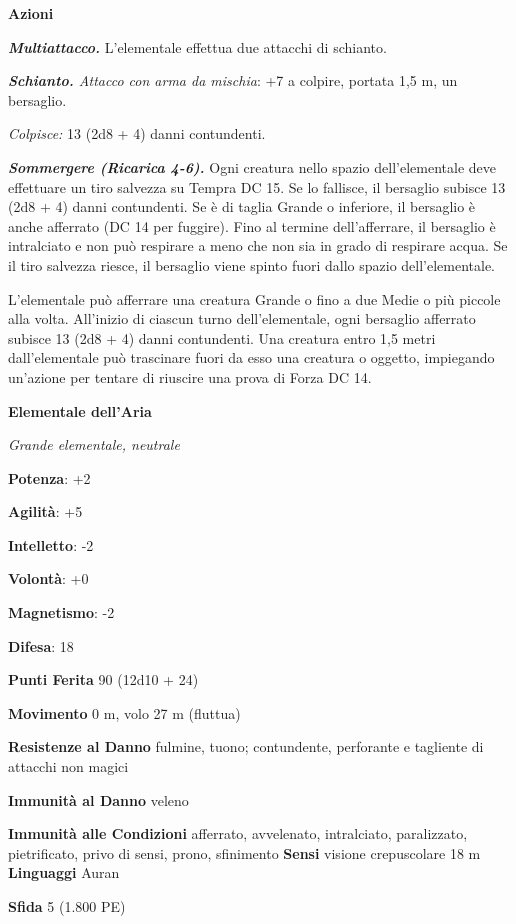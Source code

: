 \begin{multicols}{2}
\textbf{Azioni}

\emph{\textbf{Multiattacco.}} L'elementale effettua due attacchi di
schianto.

\emph{\textbf{Schianto.} Attacco con arma da mischia}: +7 a colpire,
portata 1,5 m, un bersaglio.

\emph{Colpisce:} 13 (2d8 + 4) danni contundenti.

\emph{\textbf{Sommergere (Ricarica 4-6).}} Ogni creatura nello spazio
dell'elementale deve effettuare un tiro salvezza su Tempra DC 15. Se lo
fallisce, il bersaglio subisce 13 (2d8 + 4) danni contundenti. Se è di
taglia Grande o inferiore, il bersaglio è anche afferrato (DC 14 per
fuggire). Fino al termine dell'afferrare, il bersaglio è intralciato e
non può respirare a meno che non sia in grado di respirare acqua. Se il
tiro salvezza riesce, il bersaglio viene spinto fuori dallo spazio
dell'elementale.

L'elementale può afferrare una creatura Grande o fino a due Medie o più
piccole alla volta. All'inizio di ciascun turno dell'elementale, ogni
bersaglio afferrato subisce 13 (2d8 + 4) danni contundenti. Una creatura
entro 1,5 metri dall'elementale può trascinare fuori da esso una
creatura o oggetto, impiegando un'azione per tentare di riuscire una
prova di Forza DC 14.



\textbf{Elementale dell'Aria}

\emph{Grande elementale, neutrale}

\textbf{Potenza}: +2

\textbf{Agilità}: +5

\textbf{Intelletto}: -2

\textbf{Volontà}: +0

\textbf{Magnetismo}: -2

\textbf{Difesa}: 18

\textbf{Punti Ferita} 90 (12d10 + 24)

\textbf{Movimento} 0 m, volo 27 m (fluttua)

\textbf{Resistenze al Danno} fulmine, tuono; contundente, perforante e
tagliente di attacchi non magici

\textbf{Immunità al Danno} veleno

\textbf{Immunità alle Condizioni} afferrato, avvelenato, intralciato,
paralizzato, pietrificato, privo di sensi, prono, sfinimento
\textbf{Sensi} visione crepuscolare 18 m
\textbf{Linguaggi} Auran

\textbf{Sfida} 5 (1.800 PE)


\end{multicols}
